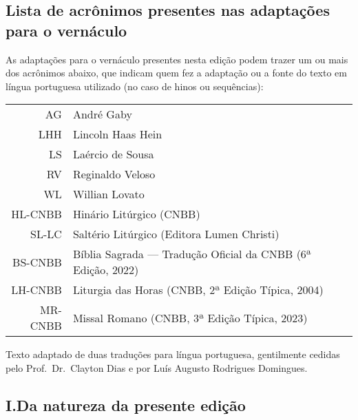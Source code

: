 \subsection{Lista de acrônimos presentes nas adaptações para o vernáculo}

As adaptações para o vernáculo presentes nesta edição podem trazer um ou mais dos acrônimos abaixo, que indicam quem fez a adaptação ou a fonte do texto em língua portuguesa utilizado (no caso de hinos ou sequências):

\begin{center}
  \begin{tabular}{rl}
    AG      & André Gaby                                                    \\
    LHH     & Lincoln Haas Hein                                             \\
    LS      & Laércio de Sousa                                              \\
    RV      & Reginaldo Veloso                                              \\
    WL      & Willian Lovato                                                \\
    HL-CNBB & Hinário Litúrgico (CNBB)                                      \\
    SL-LC   & Saltério Litúrgico (Editora Lumen Christi)                    \\
    BS-CNBB & Bíblia Sagrada --- Tradução Oficial da CNBB (6ª Edição, 2022) \\
    LH-CNBB & Liturgia das Horas (CNBB, 2ª Edição Típica, 2004)             \\
    MR-CNBB & Missal Romano (CNBB, 3ª Edição Típica, 2023)                  \\
  \end{tabular}
\end{center}

\AllowPageFlush

\label{section:praenotanda}

\begin{center}
  \begin{rubrica}
    Texto adaptado de duas traduções para língua portuguesa, gentilmente cedidas pelo Prof.\ Dr.\ Clayton Dias e por Luís Augusto Rodrigues Domingues.
  \end{rubrica}
\end{center}

\subsection{I.\@ Da natureza da presente edição}\label{subsection:praenotanda-1}

